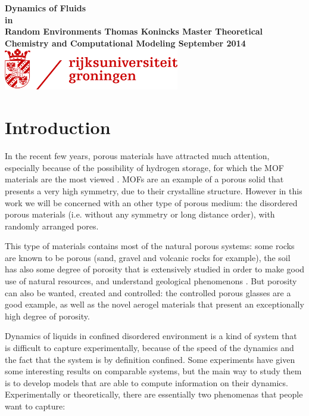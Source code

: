 \documentclass[a4paper,12pt]{article}
\newcommand{\jline}{\vspace{10pt}}
\begin{document}


\begin{titlepage}
    \centering
    \vfill
    {\bf{\Huge
    Dynamics of Fluids\\in\\Random Environments
    \vfill
    \LARGE
    Thomas Konincks
    \vskip1cm
    Master Theoretical Chemistry and Computational Modeling
    \vfill
    \LARGE September 2014}}    
    \vfill
    \includegraphics[height=1.8cm]{logos/logo_rug.png}
\end{titlepage}

\newpage

\tableofcontents

\section{Introduction}

In the recent few years, porous materials have attracted much attention, especially because of the possibility of hydrogen storage, for which the MOF materials are the most viewed \cite{Yan2009}. MOFs are an example of a porous solid that presents a very high symmetry, due to their crystalline structure. However in this work we will be concerned with an other type of porous medium: the disordered porous materials (i.e. without any symmetry or long distance order), with randomly arranged pores.\jline

This type of materials contains most of the natural porous systems: some rocks are known to be porous (sand, gravel and volcanic rocks for example), the soil has also some degree of porosity that is extensively studied in order to make good use of natural resources, and understand geological phenomenons \cite{Nasta2009, Grosbellet2011, Gab2014, Walczak2006}. But porosity can also be wanted, created and controlled: the controlled porous glasses are a good example, as well as the novel aerogel materials that present an exceptionally high degree of porosity.\jline

Dynamics of liquids in confined disordered environment is a kind of system that is difficult to capture experimentally, because of the speed of the dynamics and the fact that the system is by definition confined. Some experiments have given some interesting results on comparable systems, but the main way to study them is to develop models that are able to compute information on their dynamics. Experimentally or theoretically, there are essentially two phenomenas that people want to capture:
\end{document}

